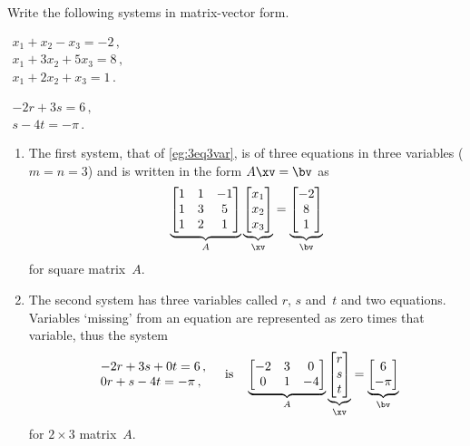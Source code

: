 \begin{example} \label{eg:matvecsys}
Write the following systems in matrix-vector form.
\begin{Parts}
\item \(\begin{array}{l}
x_1+x_2-x_3=-2\,,\\
x_1+3x_2+5x_3=8\,,\\
x_1+2x_2+x_3=1\,.
\end{array}\)

\item \(\begin{array}{l} -2r+3s=6\,,\\s-4t=-\pi\,. \end{array}\)
\end{Parts}
\begin{solution} 
\begin{enumerate}
\item The first system, that of \cref{eg:3eq3var}, is of three equations in three variables (\(m=n=3\)) and is written in the form \(A\xv=\bv\) as
\begin{equation*}
\underbrace{\begin{bmatrix} 1&1&-1\\ 1&3&5\\1&2&1 \end{bmatrix}}_A
\underbrace{\begin{bmatrix} x_1\\x_2\\x_3 \end{bmatrix}}_\xv
=\underbrace{\begin{bmatrix} -2\\8\\1 \end{bmatrix}}_\bv 
\end{equation*}
for square matrix~\(A\).

\item The second system has three variables called \(r\), \(s\) and~\(t\) and two equations.
Variables `missing' from an equation are represented as zero times that variable, thus the system
\begin{equation*}
\begin{array}{l} -2r+3s+0t=6\,,\\0r+s-4t=-\pi\,, \end{array}
\quad\text{is}\quad
\underbrace{\begin{bmatrix} -2&3&0\\ 0&1&-4 \end{bmatrix}}_A
\underbrace{\begin{bmatrix} r\\s\\t \end{bmatrix}}_\xv
=\underbrace{\begin{bmatrix} 6\\-\pi \end{bmatrix}}_\bv 
\end{equation*}
for \(2\times3\) matrix~\(A\).
\end{enumerate}
\end{solution}
\end{example}



